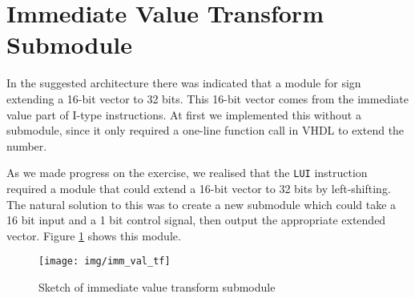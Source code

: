 \section{Immediate Value Transform Submodule}

In the suggested architecture there was indicated that a module for sign extending a 16-bit vector to 32 bits.
This 16-bit vector comes from the immediate value part of I-type instructions.
At first we implemented this without a submodule,
since it only required a one-line function call in VHDL to extend the number.

As we made progress on the exercise, we realised that the \texttt{LUI} instruction required a module that could extend a 16-bit vector to 32 bits by left-shifting.
The natural solution to this was to create a new submodule which could take a 16 bit input and a 1 bit control signal, then output the appropriate extended vector.
Figure \ref{fig:imm_val_tf} shows this module.

\begin{figure}[h]
    \centering
    \texttt{[image: img/imm\_val\_tf]}
    \caption{Sketch of immediate value transform submodule}
    \label{fig:imm_val_tf}
\end{figure}

